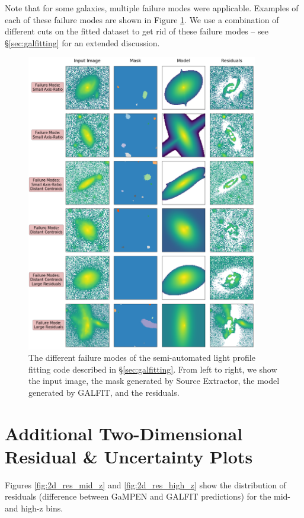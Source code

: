 \documentclass[linenumbers,twocolumn,twocolappendix]{aastex631}
\newcommand\gampen{GaMPEN}
\begin{document}
\begin{CJK*}{UTF8}{gbsn}
Note that for some galaxies, multiple failure modes were applicable. Examples of each of these failure modes are shown in Figure \ref{fig:galfit_fails}. We use a combination of different cuts on the fitted dataset to get rid of these failure modes -- see \S \ref{sec:galfitting} for an extended discussion. 

\begin{figure}[htb]
    \centering
    \includegraphics[width = 0.9\textwidth]{galfit_fails.png}
    \caption{The different failure modes of the semi-automated light profile fitting code described in \S \ref{sec:galfitting}. From left to right, we show the input image, the  mask generated by Source Extractor, the model generated by GALFIT, and the residuals.}
    \label{fig:galfit_fails}
\end{figure}


\section{Additional Two-Dimensional Residual \& Uncertainty Plots} \label{ap:sec:2d_residuals}

Figures \ref{fig:2d_res_mid_z} and \ref{fig:2d_res_high_z} show the distribution of residuals  (difference between \gampen{} and GALFIT predictions) for the mid- and high-z bins. 


\end{CJK*}
\end{document}
